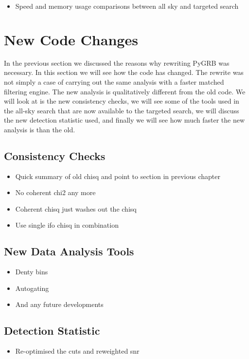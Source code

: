 \documentclass[11pt]{cuthesis}
\begin{document}
\begin{itemize}
\item Speed and memory usage comparisons between all sky and targeted search
\end{itemize}

\section{New Code Changes} \label{sec:pygrb changes}
In the previous section we discussed the reasons why rewriting PyGRB was necessary. In this section we will see how the code has changed. The rewrite was not simply a case of carrying out the same analysis with a faster matched filtering engine. The new analysis is qualitatively different from the old code. We will look at is the new consistency checks, we will see some of the tools used in the all-sky search that are now available to the targeted search, we will discuss the new detection statistic used, and finally we will see how much faster the new analysis is than the old. 

\subsection{Consistency Checks} \label{sec:new chisq}
\begin{itemize}
\item Quick summary of old chisq and point to section in previous chapter
\item No coherent chi2 any more
\item Coherent chisq just washes out the chisq
\item Use single ifo chisq in combination 
\end{itemize}


\subsection{New Data Analysis Tools}
\begin{itemize}
\item Denty bins
\item Autogating
\item And any future developments
\end{itemize}



\subsection{Detection Statistic}
\begin{itemize}
\item Re-optimised the cuts and reweighted snr
\end{itemize}
\end{document}

